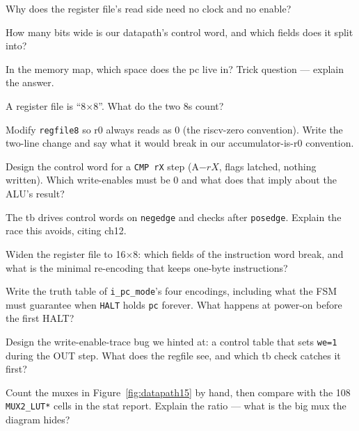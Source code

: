 \begin{exercise}[easy]
Why does the register file's read side need no clock and no enable?
\end{exercise}
\begin{exercise}[easy]
How many bits wide is our datapath's control word, and which fields
does it split into?
\end{exercise}
\begin{exercise}[easy]
In the memory map, which space does the pc live in? Trick question
--- explain the answer.
\end{exercise}
\begin{exercise}[easy]
A register file is ``8$\times$8''. What do the two 8s count?
\end{exercise}
\begin{exercise}[medium]
Modify \texttt{regfile8} so r0 always reads as 0 (the riscv-zero
convention). Write the two-line change and say what it would break in
our accumulator-is-r0 convention.
\end{exercise}
\begin{exercise}[medium]
Design the control word for a \texttt{CMP rX} step (A$-rX$, flags
latched, nothing written). Which write-enables must be 0 and what
does that imply about the ALU's result?
\end{exercise}
\begin{exercise}[medium]
The tb drives control words on \texttt{negedge} and checks after
\texttt{posedge}. Explain the race this avoids, citing ch12.
\end{exercise}
\begin{exercise}[medium]
Widen the register file to 16$\times$8: which fields of the
instruction word break, and what is the minimal re-encoding that
keeps one-byte instructions?
\end{exercise}
\begin{exercise}[hard]
Write the truth table of \texttt{i\_pc\_mode}'s four encodings,
including what the FSM must guarantee when \texttt{HALT} holds
\texttt{pc} forever. What happens at power-on before the first HALT?
\end{exercise}
\begin{exercise}[hard]
Design the write-enable-trace bug we hinted at: a control table that
sets \texttt{we=1} during the OUT step. What does the regfile see,
and which tb check catches it first?
\end{exercise}
\begin{exercise}[hard]
Count the muxes in Figure~\ref{fig:datapath15} by hand, then compare
with the 108 \texttt{MUX2\_LUT*} cells in the stat report. Explain
the ratio --- what is the big mux the diagram hides?
\end{exercise}
